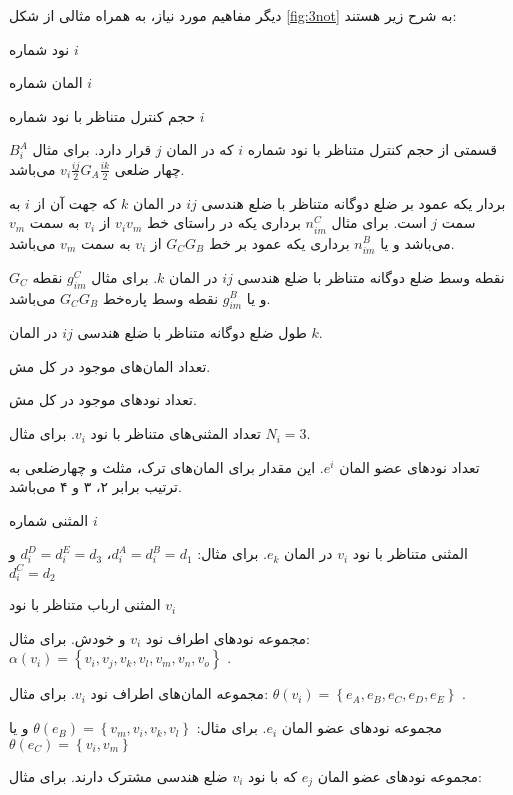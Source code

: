 دیگر مفاهیم مورد نیاز، به همراه مثالی از شکل \ref{fig:3not} به شرح زیر هستند:  
\begin{tight_itemize}
\item[$v_i$]
نود شماره $i$
\item[$e_i$]
المان شماره $i$
\item[$B_i$]
حجم کنترل متناظر با نود شماره $i$  
\item[$B_i^j$]
قسمتی از حجم کنترل متناظر با نود شماره $i$ که در المان $j$ قرار دارد. برای مثال $B_i^A$ چهار ضلعی
$v_i\frac{ij}{2}G_A\frac{ik}{2}$
می‌باشد.  
\item[$n_{ij}^k$]
بردار یکه عمود بر ضلع دو‌گانه متناظر با ضلع هندسی $ij$ در المان $k$ که جهت آن از $i$ به سمت $j$ است. برای مثال 
$n_{im}^C$
برداری یکه در راستای خط $v_iv_m$ از $v_i$ به سمت $v_m$ می‌باشد و یا 
$n_{im}^B$
برداری یکه عمود بر خط $G_CG_B$ از $v_i$ به سمت $v_m$ می‌باشد. 
\item[$g_{ij}^k$]
نقطه وسط ضلع دو‌گانه متناظر با ضلع هندسی $ij$ در المان $k$. برای مثال  
$g_{im}^C$
نقطه $G_C$ و یا 
$g_{im}^B$
نقطه وسط پاره‌خط $G_CG_B$ می‌باشد.  
\item[$l_{ij}^k$]
طول ضلع دو‌گانه متناظر با ضلع هندسی $ij$ در المان $k$. 
\item[\lr{NE}]
تعداد المان‌های موجود در کل مش. 
\item[\lr{NV}]
تعداد نود‌های موجود در کل مش. 
\item[$N_i$]
تعداد المثنی‌های متناظر با نود $v_i$. برای مثال $N_i=3$. 
\item[$N^i$]
تعداد نود‌های عضو المان $e^i$. این مقدار برای المان‌های ترک، مثلث و چهارضلعی به ترتیب برابر ۲، ۳ و ۴ می‌باشد. 
\item[$d_i$]
المثنی شماره $i$
\item[$d_i^k$]
المثنی متناظر با نود $v_i$ در المان $e_k$. برای مثال:
$d_i^A=d_i^B=d_1$، $d_i^D=d_i^E=d_3$ و $d_i^C = d_2$ 
\item[$d_i^*$]
 المثنی ارباب متناظر با نود $v_i$ 
\item[$\alpha(v_i)$]
مجموعه نود‌های اطراف نود $v_i$ و خودش. برای مثال:
$\alpha(v_i) = \left\{ v_i, v_j, v_k, v_l, v_m, v_n, v_o \right\}$ .
\item[$\theta(v_i)$]
 مجموعه المان‌های اطراف نود $v_i$. برای مثال:
$\theta(v_i) = \left\{ e_A, e_B, e_C, e_D, e_E \right\}$ . 
\item[$\sigma(e_i)$]
 مجموعه نود‌های عضو المان $e_i$. برای مثال:
$\theta(e_B) = \left\{ v_m, v_i, v_k, v_l \right\}$ و یا $\theta(e_C) = \left\{ v_i, v_m \right\}$ 
\item[$\eta(v_i,e_j)$]
مجموعه نود‌های عضو المان $e_j$ که با نود $v_i$ ضلع هندسی مشترک دارند. برای مثال:\\

\end{tight_itemize}
